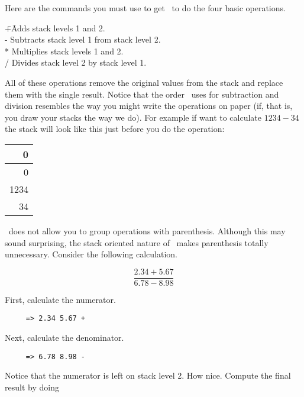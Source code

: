 \documentclass{report}
\begin{document}
Here are the commands you must use to get \CLAC\ to do the four basic operations.

\begin{tabbing}
\hspace*{3em}\=+\hspace{3em}\=Adds stack levels 1 and 2.\\
\>             -\>            Subtracts stack level 1 from stack level 2.\\
\>             *\>            Multiplies stack levels 1 and 2.\\
\>             /\>            Divides stack level 2 by stack level 1.\\
\end{tabbing}

All of these operations remove the original values from the stack and replace them with the
single result. Notice that the order \CLAC\ uses for subtraction and division resembles the way
you might write the operations on paper (if, that is, you draw your stacks the way we do). For
example if want to calculate $1234 - 34$ the stack will look like this just before you do the
operation:

\begin{tabular}{|r|} \hline
    0 \\ \hline
    0 \\ \hline
 1234 \\ \hline
   34 \\ \hline
\end{tabular}

\CLAC\ does not allow you to group operations with parenthesis. Although this may sound
surprising, the stack oriented nature of \CLAC\ makes parenthesis totally unnecessary. Consider
the following calculation.

\begin{displaymath}
     \frac { 2.34 + 5.67 }{ 6.78 - 8.98 }
\end{displaymath}

First, calculate the numerator.

\begin{verbatim}
     => 2.34 5.67 +
\end{verbatim}

Next, calculate the denominator.

\begin{verbatim}
     => 6.78 8.98 -
\end{verbatim}

Notice that the numerator is left on stack level 2. How nice. Compute the final result by doing
\end{document}
